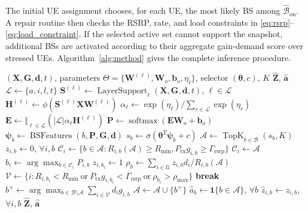 \documentclass[journal]{IEEEtran}
\begin{document}
The initial UE assignment chooses, for each UE, the most likely BS among
$\widehat{\mathcal{B}}_{\mathrm{on}}$. A repair routine then checks the RSRP,
rate, and load constraints in \eqref{eq:rsrp}--\eqref{eq:load_constraint}. If
the selected active set cannot support the snapshot, additional BSs are
activated according to their aggregate gain-demand score over stressed UEs.
Algorithm~\ref{alg:method} gives the complete inference procedure.

\begin{algorithm}[!t]
\caption{Multilayer GNN Association With Active-BS Repair}
\label{alg:method}
\begin{algorithmic}[1]
\Require $(\mathbf{X},\mathbf{G},\mathbf{d},t)$, parameters
$\Theta=\{\mathbf{W}^{(\ell)},\mathbf{W}_o,\mathbf{b}_o,\eta_{\ell}\}$,
selector $(\boldsymbol{\theta},c)$, $K$
\Ensure $\widehat{\mathbf{Z}}$, $\widehat{\mathbf{a}}$
\State $\mathcal{L}\gets\{a,i,l,t\}$
\State $\mathbf{S}^{(\ell)}\gets\operatorname{LayerSupport}_{\ell}
(\mathbf{X},\mathbf{G},\mathbf{d},t)$, $\ell\in\mathcal{L}$
    \State $\mathbf{H}^{(\ell)}
    \gets \phi(\mathbf{S}^{(\ell)}\mathbf{X}\mathbf{W}^{(\ell)})$
\EndFor
\State $\alpha_{\ell}\gets
\exp(\eta_{\ell})/\sum_{r\in\mathcal{L}}\exp(\eta_r)$
\State $\mathbf{E}\gets
\Vert_{\ell\in\mathcal{L}}\left(|\mathcal{L}|\alpha_{\ell}
\mathbf{H}^{(\ell)}\right)$
\State $\mathbf{P}\gets\operatorname{softmax}(\mathbf{E}\mathbf{W}_o+\mathbf{b}_o)$
    \State $\boldsymbol{\psi}_b\gets\operatorname{BSFeatures}(b,\mathbf{P},
    \mathbf{G},\mathbf{d})$
    \State $s_b\gets\sigma(\boldsymbol{\theta}^{T}\boldsymbol{\psi}_b+c)$
\EndFor
\State $\mathcal{A}\gets\operatorname{TopK}_{b\in\mathcal{B}}(s_b,K)$
\Repeat
    \State $z_{i,b}\gets0$, $\forall i,b$
        \State $\mathcal{C}_i\gets
        \{b\in\mathcal{A}:R_{i,b}(\mathcal{A})\geq R_{\min},
        P_{\mathrm{tx}}g_{i,b}\geq\Gamma_{\mathrm{rsrp}}\}$
            \State $\mathcal{C}_i\gets\mathcal{A}$
        \EndIf
        \State $b_i\gets\arg\max_{b\in\mathcal{C}_i}P_{i,b}$
        \State $z_{i,b_i}\gets1$
    \EndFor
    \State $\rho_b\gets\sum_{i\in\mathcal{U}}z_{i,b}d_i/R_{i,b}(\mathcal{A})$
    \State $\mathcal{V}\gets\{i:R_{i,b_i}<R_{\min}\ \text{or}\
    P_{\mathrm{tx}}g_{i,b_i}<\Gamma_{\mathrm{rsrp}}\ \text{or}\
    \rho_{b_i}>\rho_{\max}\}$
    \If{$\mathcal{V}=\varnothing$ or $|\mathcal{A}|=B$}
        \State \textbf{break}
    \EndIf
    \State $b^{+}\gets
    \arg\max_{b\in\mathcal{B}\setminus\mathcal{A}}
    \sum_{i\in\mathcal{V}}d_i g_{i,b}$
    \State $\mathcal{A}\gets\mathcal{A}\cup\{b^{+}\}$
\State $\widehat{a}_b\gets\mathbf{1}\{b\in\mathcal{A}\}$, $\forall b$
\State $\widehat{z}_{i,b}\gets z_{i,b}$, $\forall i,b$
\State \Return $\widehat{\mathbf{Z}}$, $\widehat{\mathbf{a}}$
\end{algorithmic}
\end{algorithm}
\end{document}
